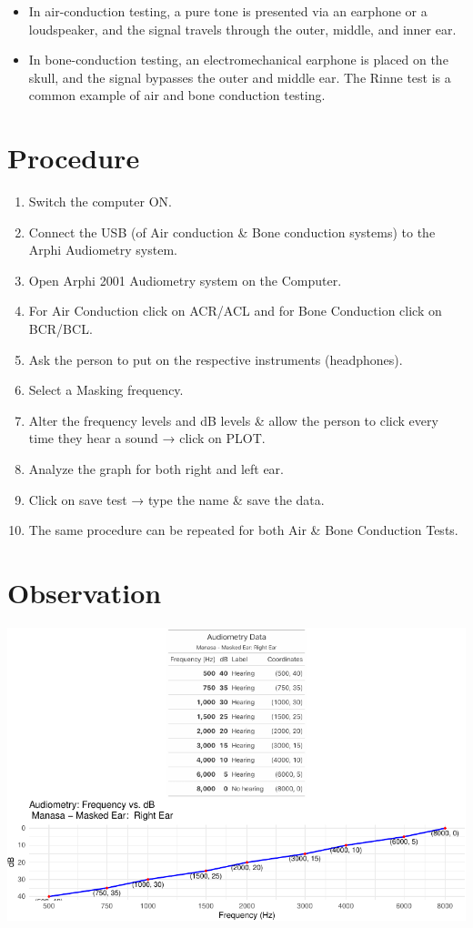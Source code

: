 \documentclass[
  11pt,
  letterpaper,
  DIV=11,
  numbers=noendperiod]{scrreprt}
\providecommand{\tightlist}{%
  \setlength{\itemsep}{0pt}\setlength{\parskip}{0pt}}\usepackage{longtable,booktabs,array}
\begin{document}
\begin{itemize}
\item
  In air-conduction testing, a pure tone is presented via an earphone or
  a loudspeaker, and the signal travels through the outer, middle, and
  inner ear.
\item
  In bone-conduction testing, an electromechanical earphone is placed on
  the skull, and the signal bypasses the outer and middle ear. The Rinne
  test is a common example of air and bone conduction testing.
\end{itemize}

\section{Procedure}\label{procedure-4}

\begin{enumerate}
\def\labelenumi{\arabic{enumi}.}
\tightlist
\item
  Switch the computer ON.
\item
  Connect the USB (of Air conduction \& Bone conduction systems) to the
  Arphi Audiometry system.
\item
  Open Arphi 2001 Audiometry system on the Computer.
\item
  For Air Conduction click on ACR/ACL and for Bone Conduction click on
  BCR/BCL.
\item
  Ask the person to put on the respective instruments (headphones).
\item
  Select a Masking frequency.
\item
  Alter the frequency levels and dB levels \& allow the person to click
  every time they hear a sound → click on PLOT.
\item
  Analyze the graph for both right and left ear.
\item
  Click on save test → type the name \& save the data.
\item
  The same procedure can be repeated for both Air \& Bone Conduction
  Tests.
\end{enumerate}

\section{Observation}\label{observation-5}

\includegraphics{audiometry_files/figure-pdf/unnamed-chunk-1-1.pdf}
\end{document}
